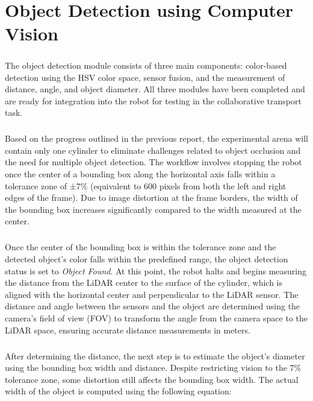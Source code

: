 \chapter{Object Detection using Computer Vision}

\paragraph*{}
The object detection module consists of three main components: color-based detection using the HSV color space, sensor fusion, and the measurement of distance, angle, and object diameter. All three modules have been completed and are ready for integration into the robot for testing in the collaborative transport task.

\paragraph*{}
Based on the progress outlined in the previous report, the experimental arena will contain only one cylinder to eliminate challenges related to object occlusion and the need for multiple object detection. The workflow involves stopping the robot once the center of a bounding box along the horizontal axis falls within a tolerance zone of ±7\% (equivalent to 600 pixels from both the left and right edges of the frame). Due to image distortion at the frame borders, the width of the bounding box increases significantly compared to the width measured at the center.

\paragraph*{}
Once the center of the bounding box is within the tolerance zone and the detected object's color falls within the predefined range, the object detection status is set to \textit{Object Found}. At this point, the robot halts and begins measuring the distance from the LiDAR center to the surface of the cylinder, which is aligned with the horizontal center and perpendicular to the LiDAR sensor. The distance and angle between the sensors and the object are determined using the camera's field of view (FOV) to transform the angle from the camera space to the LiDAR space, ensuring accurate distance measurements in meters.

\paragraph*{}
After determining the distance, the next step is to estimate the object's diameter using the bounding box width and distance. Despite restricting vision to the 7\% tolerance zone, some distortion still affects the bounding box width. The actual width of the object is computed using the following equation:


